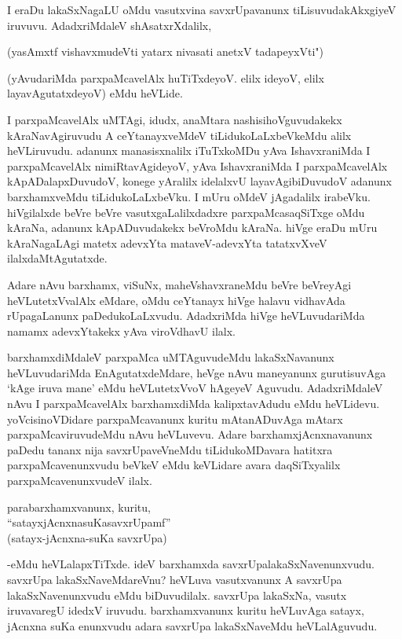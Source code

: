 I eraDu lakaSxNagaLU oMdu vasutxvina savxrUpavanunx tiLisuvudakAkxgiyeV iruvuvu. AdadxriMdaleV shAsatxrXdalilx,

\begin{shloka}
(yasAmxtf vishavxmudeVti yatarx nivasati anetxV tadapeyxVti")
\end{shloka}

(yAvudariMda parxpaMcavelAlx huTiTxdeyoV. elilx ideyoV, elilx layavAgutatxdeyoV) eMdu heVLide.

I parxpaMcavelAlx uMTAgi, idudx, anaMtara nashisihoVguvudakekx kAraNavAgiruvudu A ceYtanayxveMdeV tiLidukoLaLxbeVkeMdu alilx heVLiruvudu. adanunx manasisxnalilx iTuTxkoMDu yAva IshavxraniMda I parxpaMcavelAlx nimiRtavAgideyoV, yAva IshavxraniMda I parxpaMcavelAlx kApADalapxDuvudoV, konege yAralilx idelalxvU layavAgibiDuvudoV adanunx barxhamxveMdu tiLidukoLaLxbeVku. I mUru oMdeV jAgadalilx irabeVku. hiVgilalxde beVre beVre vasutxgaLalilxdadxre parxpaMcasaqSiTxge oMdu kAraNa, adanunx kApADuvudakekx beVroMdu kAraNa. hiVge eraDu mUru kAraNagaLAgi matetx adevxYta mataveV-adevxYta tatatxvXveV ilalxdaMtAgutatxde. 

Adare nAvu barxhamx, viSuNx, maheVshavxraneMdu beVre beVreyAgi heVLutetxVvalAlx eMdare, oMdu ceYtanayx hiVge halavu vidhavAda rUpagaLanunx paDedukoLaLxvudu. AdadxriMda hiVge heVLuvudariMda namamx adevxYtakekx yAva viroVdhavU ilalx. 

barxhamxdiMdaleV parxpaMca uMTAguvudeMdu lakaSxNavanunx heVLuvudariMda EnAgutatxdeMdare, heVge nAvu maneyanunx gurutisuvAga `kAge iruva mane' eMdu heVLutetxVvoV hAgeyeV Aguvudu. AdadxriMdaleV nAvu I parxpaMcavelAlx barxhamxdiMda kalipxtavAdudu eMdu heVLidevu. yoVcisinoVDidare parxpaMcavanunx kuritu mAtanADuvAga mAtarx parxpaMcaviruvudeMdu nAvu heVLuvevu. Adare barxhamxjAcnxnavanunx paDedu tananx nija savxrUpaveVneMdu tiLidukoMDavara hatitxra parxpaMcavenunxvudu beVkeV eMdu keVLidare avara daqSiTxyalilx parxpaMcavenunxvudeV ilalx.

\begin{shloka}
parabarxhamxvanunx, kuritu, \\
``satayxjAcnxnasuKasavxrUpamf''\\
(satayx-jAcnxna-suKa savxrUpa)
\end{shloka}

-eMdu heVLalapxTiTxde. ideV barxhamxda savxrUpalakaSxNavenunxvudu. savxrUpa lakaSxNaveMdareVnu? heVLuva vasutxvanunx A savxrUpa lakaSxNavenunxvudu eMdu biDuvudilalx. savxrUpa lakaSxNa, vasutx iruvavaregU idedxV iruvudu. barxhamxvanunx kuritu heVLuvAga satayx, jAcnxna suKa enunxvudu adara savxrUpa lakaSxNaveMdu heVLalAguvudu.

